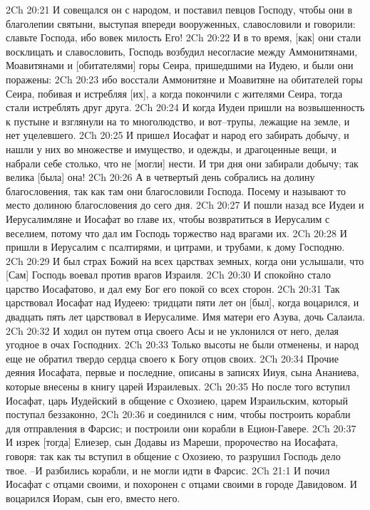 2Ch 20:21  И совещался он с народом, и поставил певцов Господу, чтобы они в благолепии святыни, выступая впереди вооруженных, славословили и говорили: славьте Господа, ибо вовек милость Его!
2Ch 20:22  И в то время, [как] они стали восклицать и славословить, Господь возбудил несогласие между Аммонитянами, Моавитянами и [обитателями] горы Сеира, пришедшими на Иудею, и были они поражены:
2Ch 20:23  ибо восстали Аммонитяне и Моавитяне на обитателей горы Сеира, побивая и истребляя [их], а когда покончили с жителями Сеира, тогда стали истреблять друг друга.
2Ch 20:24  И когда Иудеи пришли на возвышенность к пустыне и взглянули на то многолюдство, и вот--трупы, лежащие на земле, и нет уцелевшего.
2Ch 20:25  И пришел Иосафат и народ его забирать добычу, и нашли у них во множестве и имущество, и одежды, и драгоценные вещи, и набрали себе столько, что не [могли] нести. И три дня они забирали добычу; так велика [была] она!
2Ch 20:26  А в четвертый день собрались на долину благословения, так как там они благословили Господа. Посему и называют то место долиною благословения до сего дня.
2Ch 20:27  И пошли назад все Иудеи и Иерусалимляне и Иосафат во главе их, чтобы возвратиться в Иерусалим с веселием, потому что дал им Господь торжество над врагами их.
2Ch 20:28  И пришли в Иерусалим с псалтирями, и цитрами, и трубами, к дому Господню.
2Ch 20:29  И был страх Божий на всех царствах земных, когда они услышали, что [Сам] Господь воевал против врагов Израиля.
2Ch 20:30  И спокойно стало царство Иосафатово, и дал ему Бог его покой со всех сторон.
2Ch 20:31  Так царствовал Иосафат над Иудеею: тридцати пяти лет он [был], когда воцарился, и двадцать пять лет царствовал в Иерусалиме. Имя матери его Азува, дочь Салаила.
2Ch 20:32  И ходил он путем отца своего Асы и не уклонился от него, делая угодное в очах Господних.
2Ch 20:33  Только высоты не были отменены, и народ еще не обратил твердо сердца своего к Богу отцов своих.
2Ch 20:34  Прочие деяния Иосафата, первые и последние, описаны в записях Ииуя, сына Ананиева, которые внесены в книгу царей Израилевых.
2Ch 20:35  Но после того вступил Иосафат, царь Иудейский в общение с Охозиею, царем Израильским, который поступал беззаконно,
2Ch 20:36  и соединился с ним, чтобы построить корабли для отправления в Фарсис; и построили они корабли в Ецион-Гавере.
2Ch 20:37  И изрек [тогда] Елиезер, сын Додавы из Мареши, пророчество на Иосафата, говоря: так как ты вступил в общение с Охозиею, то разрушил Господь дело твое. --И разбились корабли, и не могли идти в Фарсис.
2Ch 21:1  И почил Иосафат с отцами своими, и похоронен с отцами своими в городе Давидовом. И воцарился Иорам, сын его, вместо него.
